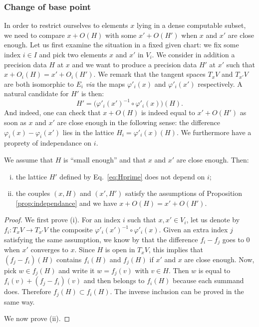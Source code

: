\documentclass{amsart}
\begin{document}
\subsubsection*{Change of base point}

In order to restrict ourselves to elements $x$ lying in a dense 
computable subset, we need to compare $x + O(H)$ with some $x' + 
O(H')$ when $x$ and $x'$ are close enough.
Let us first examine the situation in a fixed given chart: we fix some 
index $i \in I$ and pick two elements $x$ and $x'$ in $V_i$. We consider 
in addition a precision data $H$ at $x$ and we want to produce a 
precision data $H'$ at $x'$ such that $x + O_i(H) = x' + O_i(H')$. 
We remark that the tangent spaces $T_x V$ and $T_{x'} V$ are both 
isomorphic to $E_i$ \emph{via} the maps $\varphi'_i(x)$ and 
$\varphi'_i(x')$ respectively. A natural candidate for $H'$ is then:
\begin{equation}
\label{eq:Hprime}
H' = \big(\varphi'_i(x')^{-1} \circ \varphi'_i(x)\big) (H).
\end{equation}
And indeed, one can check that $x + O(H)$ is indeed equal to $x' + 
O(H')$ as soon as $x$ and $x'$ are close enough in the following sense: 
the difference $\varphi_i(x) - \varphi_i(x')$ lies in the lattice $H_i = 
\varphi'_i(x)(H)$. We furthermore have a proprety of independance on 
$i$.

\begin{prop}
We assume that $H$ is ``small enough''  and that $x$ and 
$x'$ are close enough. Then:
\begin{enumerate}[(i)]
\item the lattice $H'$ defined by Eq.~\eqref{eq:Hprime} does not depend 
on $i$;
\item the couples $(x,H)$ and $(x', H')$ satisfy the assumptions of
Proposition \ref{prop:independance} and we have $x + O(H) = x' + O(H')$.
\end{enumerate}
\end{prop}

\begin{proof}
We first prove (i). For an index $i$ such that $x, x' \in V_i$, let us 
denote by $f_i : T_x V \to T_{x'} V$ the composite $\varphi'_i(x')^{-1} 
\circ \varphi'_i(x)$. Given an extra index $j$ satisfying the same
assumption, we know by  that the difference
$f_i - f_j$ goes to $0$ when $x'$ converges to $x$. Since $H$ is open
in $T_x V$, this implies that $(f_j - f_i)(H)$ contains $f_i(H)$ and 
$f_j(H)$ if $x'$ and $x$ are close enough. Now, pick $w \in f_j(H)$ and 
write it $w = f_j(v)$ with $v \in H$. Then $w$ is equal to $f_i(v) + 
(f_j - f_i)(v)$ and then belongs to $f_i(H)$ because each summand does. 
Therefore $f_j(H) \subset f_i(H)$. The inverse inclusion can be proved 
in the same way.

We now prove (ii). 
\end{proof}
\end{document}
